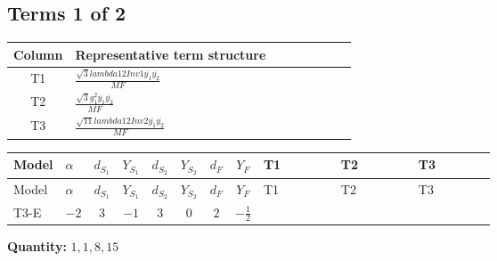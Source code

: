 \documentclass[8pt]{article}
\begin{document}
\begin{landscape}
\subsection*{Terms 1 of 2}
\begin{center}
\begin{tabular}{@{}c >{\raggedright\arraybackslash}p{0.82\linewidth}@{}}
\toprule
Column & Representative term structure \\
\midrule
T1 & \(\displaystyle \frac{\sqrt{3} lambda12Inv1 \overline{y_{1}} \overline{y_{2}}}{MF}\) \\
\midrule
T2 & \(\displaystyle \frac{\sqrt{3} g_{1}^{2} \overline{y_{1}} \overline{y_{2}}}{MF}\) \\
\midrule
T3 & \(\displaystyle \frac{\sqrt{11} lambda12Inv2 \overline{y_{1}} \overline{y_{2}}}{MF}\) \\
\midrule
\bottomrule
\end{tabular}
\end{center}
\smallskip
\tiny
\begin{longtable}{@{}llcccccc >{\raggedright\arraybackslash}p{0.21\linewidth} >{\raggedright\arraybackslash}p{0.21\linewidth} >{\raggedright\arraybackslash}p{0.21\linewidth}@{}}
\toprule
Model & $\alpha$ & $d_{S_1}$ & $Y_{S_1}$ & $d_{S_2}$ & $Y_{S_2}$ & $d_F$ & $Y_F$ & T1 & T2 & T3 \\
\midrule
\endfirsthead
\toprule
Model & $\alpha$ & $d_{S_1}$ & $Y_{S_1}$ & $d_{S_2}$ & $Y_{S_2}$ & $d_F$ & $Y_F$ & T1 & T2 & T3 \\
\midrule
\endhead
T3-E & $-2$ & $3$ & $-1$ & $3$ & $0$ & $2$ & $-\frac{1}{2}$ & \scriptsize\adjustbox{max width=\linewidth}{$\begin{gathered} - \frac{\sqrt{3} lambda12Inv1 \overline{y_{1}} \overline{y_{2}}}{6 MF}\end{gathered}$} & \scriptsize\adjustbox{max width=\linewidth}{$\begin{gathered} \frac{\sqrt{3} g_{1}^{2} \overline{y_{1}} \overline{y_{2}}}{8 MF}\end{gathered}$} & \scriptsize\adjustbox{max width=\linewidth}{$\begin{gathered} \frac{3 \sqrt{11} lambda12Inv2 \overline{y_{1}} \overline{y_{2}}}{22 MF}\end{gathered}$} \\
\midrule
\bottomrule
\end{longtable}
\clearpage
\noindent\textbf{Quantity: }$\mathrm{1,1,8,15}$\par\smallskip

\end{landscape}
\end{document}
